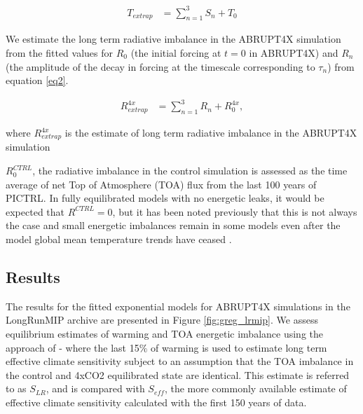\documentclass[esd, article]{copernicus}
\begin{document}
\begin{align}
   T_{extrap}&=\sum_{n=1}^3 S_n+T_0
\label{eq3}
\end{align}

We estimate the long term radiative imbalance in the ABRUPT4X simulation from the fitted values for $R_0$ (the initial forcing at $t=0$ in ABRUPT4X) and $R_n$ (the amplitude of the decay in forcing at the timescale corresponding to $\tau_n$) from equation \ref{eq2}.

\begin{align}
   R^{4x}_{extrap} &=\sum_{n=1}^3 R_n+R^{4x}_0,
\label{eq4}
\end{align}

where $R^{4x}_{extrap}$ is the estimate of long term radiative imbalance in the ABRUPT4X simulation

$R^{CTRL}_0$, the radiative imbalance in the control simulation is assessed as the time average of net Top of Atmosphere (TOA) flux from the last 100 years of PICTRL.  In fully equilibrated models with no energetic leaks, it would be expected that $R^{CTRL}=0$, but it has been noted previously that this is not always the case and small energetic imbalances remain in some models even after the model global mean temperature trends have ceased \citep{rugenstein2019longrunmip}.



\subsection{Results}
The results for the fitted exponential models for ABRUPT4X simulations in the LongRunMIP archive are presented in Figure \ref{fig:greg_lrmip}.  We assess equilibrium estimates of warming and TOA energetic imbalance using the approach of \cite{rugenstein2020equilibrium} - where the last 15$\%$ of warming is used to estimate long term effective climate sensitivity  \citep{gregory2004new} subject to an assumption that the TOA imbalance in the control and 4xCO2 equilibrated state are identical.  This estimate is referred to as $S_{LR}$, and is compared with $S_{eff}$, the more commonly available estimate of effective climate sensitivity calculated with the first 150 years of data.
\end{document}
